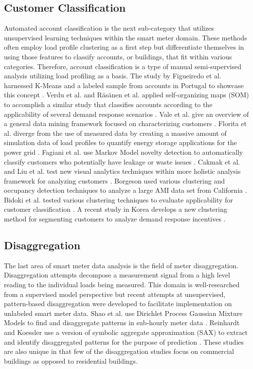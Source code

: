 \subsection{Customer Classification}
Automated account classification is the next sub-category that utilizes unsupervised learning techniques within the smart meter domain. These methods often employ load profile clustering as a first step but differentiate themselves in using those features to classify accounts, or buildings, that fit within various categories. Therefore, account classification is a type of manual semi-supervised analysis utilizing load profiling as a basis. The study by Figueiredo et al. harnessed K-Means and a labeled sample from accounts in Portugal to showcase this concept \citep{figueiredo_electric_2005}. Verdu et al. and R\"as\"anen et al. applied self-organizing maps (SOM) to accomplish a similar study that classifies accounts according to the applicability of several demand response scenarios \citep{verdu_classification_2006,rasanen_reducing_2008}. Vale et al. give an overview of a general data mining framework focused on characterizing customers \citep{vale_data_2009}. Florita et al. diverge from the use of measured data by creating a massive amount of simulation data of load profiles to quantify energy storage applications for the power grid \citep{florita_classification_2012}. Fagiani et al. use Markov Model novelty detection to automatically classify customers who potentially have leakage or waste issues \citep{fagiani_novelty_2015}. Cakmak et al. and Liu et al. test new visual analytics techniques within more holistic analysis framework for analyzing customers \citep{cakmak_new_2014,liu_smas:_2015}. Borgeson used various clustering and occupancy detection techniques to analyze a large AMI data set from California \citep{borgeson_targeted_2013}. Bidoki et al. tested various clustering techniques to evaluate applicability for customer classification \citep{bidoki_evaluating_2010}. A recent study in Korea develops a new clustering method for segmenting customers to analyze demand response incentives \citep{jang_variability_2016}.

\subsection{Disaggregation}
The last area of smart meter data analysis is the field of meter disaggregation. Disaggregation attempts decompose a measurement signal from a high level reading to the individual loads being measured. This domain is well-researched from a supervised model perspective but recent attempts at unsupervised, pattern-based disaggregation were developed to facilitate implementation on unlabeled smart meter data. Shao et al. use Dirichlet Process Gaussian Mixture Models to find and disaggregate patterns in sub-hourly meter data \citep{shao_temporal_2013}. Reinhardt and Koessler use a version of symbolic aggregate approximation (SAX) to extract and identify disaggregated patterns for the purpose of prediction \citep{reinhardt_powersax:_2014}. These studies are also unique in that few of the disaggregation studies focus on commercial buildings as opposed to residential buildings.

